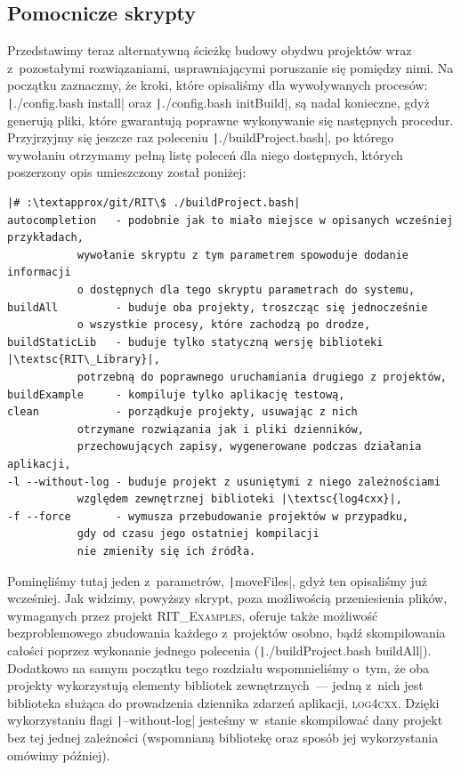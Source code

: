\subsection{Pomocnicze skrypty}



Przedstawimy teraz alternatywną ścieżkę budowy obydwu projektów wraz z~pozostałymi rozwiązaniami, usprawniającymi poruszanie się pomiędzy nimi.
Na początku zaznaczmy, że kroki, które opisaliśmy dla wywoływanych procesów: \texttt|./config.bash install| oraz \texttt|./config.bash initBuild|, są nadal konieczne, gdyż generują pliki, które gwarantują poprawne wykonywanie się następnych procedur.
Przyjrzyjmy się jeszcze raz poleceniu \texttt|./buildProject.bash|, po którego wywołaniu otrzymamy pełną listę poleceń dla niego dostępnych, których poszerzony opis umieszczony został poniżej:

\begin{verbatim}
|# :\textapprox/git/RIT\$ ./buildProject.bash|
autocompletion   - podobnie jak to miało miejsce w opisanych wcześniej przykładach, 
		   wywołanie skryptu z tym parametrem spowoduje dodanie informacji 
		   o dostępnych dla tego skryptu parametrach do systemu,
buildAll         - buduje oba projekty, troszcząc się jednocześnie 
		   o wszystkie procesy, które zachodzą po drodze,
buildStaticLib   - buduje tylko statyczną wersję biblioteki |\textsc{RIT\_Library}|, 
		   potrzebną do poprawnego uruchamiania drugiego z projektów,
buildExample     - kompiluje tylko aplikację testową,
clean            - porządkuje projekty, usuwając z nich 
		   otrzymane rozwiązania jak i pliki dzienników, 
		   przechowujących zapisy, wygenerowane podczas działania aplikacji,
-l --without-log - buduje projekt z usuniętymi z niego zależnościami
		   względem zewnętrznej biblioteki |\textsc{log4cxx}|,
-f --force       - wymusza przebudowanie projektów w przypadku, 
		   gdy od czasu jego ostatniej kompilacji 
		   nie zmieniły się ich źródła.
\end{verbatim}

Pominęliśmy tutaj jeden z~parametrów, \texttt|moveFiles|, gdyż ten opisaliśmy już wcześniej.
Jak widzimy, powyższy skrypt, poza możliwością przeniesienia plików, wymaganych przez projekt \textsc{RIT\_Examples}, oferuje także możliwość bezproblemowego zbudowania każdego z~projektów osobno, bądź skompilowania całości poprzez wykonanie jednego polecenia (\texttt|./buildProject.bash buildAll|).
Dodatkowo na samym początku tego rozdziału wspomnieliśmy o~tym, że oba projekty wykorzystują elementy bibliotek zewnętrznych~--- jedną z~nich jest biblioteka służąca do prowadzenia dziennika zdarzeń aplikacji, \textsc{log4cxx}.
Dzięki wykorzystaniu flagi \texttt|--without-log| jesteśmy w~stanie skompilować dany projekt bez tej jednej zależności (wspomnianą bibliotekę oraz sposób jej wykorzystania omówimy później).

